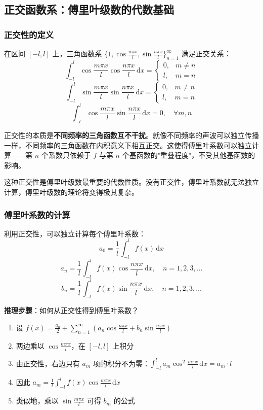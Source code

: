 \subsection{正交函数系：傅里叶级数的代数基础}

\subsubsection{正交性的定义}

在区间 $[-l, l]$ 上，三角函数系 $\{1, \cos\frac{n\pi x}{l}, \sin\frac{n\pi x}{l}\}_{n=1}^\infty$ 满足正交关系：
\[
\int_{-l}^{l} \cos\frac{m\pi x}{l}\cos\frac{n\pi x}{l}\,\mathrm{d}x = \begin{cases} 0, & m\neq n \\ l, & m=n \end{cases}
\]
\[
\int_{-l}^{l} \sin\frac{m\pi x}{l}\sin\frac{n\pi x}{l}\,\mathrm{d}x = \begin{cases} 0, & m\neq n \\ l, & m=n \end{cases}
\]
\[
\int_{-l}^{l} \cos\frac{m\pi x}{l}\sin\frac{n\pi x}{l}\,\mathrm{d}x = 0, \quad \forall m, n
\]

\begin{essencebox}
正交性的本质是\textbf{不同频率的三角函数互不干扰}。就像不同频率的声波可以独立传播一样，不同频率的三角函数在内积意义下相互正交。这使得傅里叶系数可以独立计算——第 $n$ 个系数只依赖于 $f$ 与第 $n$ 个基函数的"重叠程度"，不受其他基函数的影响。

这种正交性是傅里叶级数最重要的代数性质。没有正交性，傅里叶系数就无法独立计算，傅里叶级数的理论将变得极其复杂。
\end{essencebox}

\subsubsection{傅里叶系数的计算}

利用正交性，可以独立计算每个傅里叶系数：
\[
a_0 = \frac{1}{l}\int_{-l}^{l} f(x)\,\mathrm{d}x
\]
\[
a_n = \frac{1}{l}\int_{-l}^{l} f(x)\cos\frac{n\pi x}{l}\,\mathrm{d}x, \quad n = 1, 2, 3, \ldots
\]
\[
b_n = \frac{1}{l}\int_{-l}^{l} f(x)\sin\frac{n\pi x}{l}\,\mathrm{d}x, \quad n = 1, 2, 3, \ldots
\]

\begin{insightbox}
\textbf{推理步骤}：如何从正交性得到傅里叶系数？
\begin{enumerate}[leftmargin=2em]
    \item 设 $f(x) = \frac{a_0}{2} + \sum_{n=1}^\infty (a_n\cos\frac{n\pi x}{l} + b_n\sin\frac{n\pi x}{l})$
    \item 两边乘以 $\cos\frac{m\pi x}{l}$，在 $[-l,l]$ 上积分
    \item 由正交性，右边只有 $a_m$ 项的积分不为零：$\int_{-l}^l a_m\cos^2\frac{m\pi x}{l}\,\mathrm{d}x = a_m \cdot l$
    \item 因此 $a_m = \frac{1}{l}\int_{-l}^l f(x)\cos\frac{m\pi x}{l}\,\mathrm{d}x$
    \item 类似地，乘以 $\sin\frac{m\pi x}{l}$ 可得 $b_m$ 的公式
\end{enumerate}
\end{insightbox}

